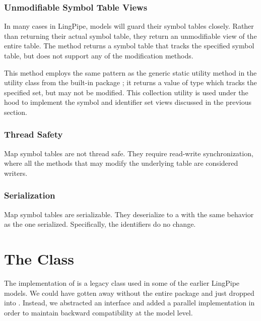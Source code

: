 \subsubsection{Unmodifiable Symbol Table Views}

In many cases in LingPipe, models will guard their symbol tables
closely.  Rather than returning their actual symbol table, they return
an unmodifiable view of the entire table.  The method
 returns a symbol table that tracks
the specified symbol table, but does not support any of the modification
methods.  

This method employs the same pattern as the generic static utility
method  in the utility
class  from the built-in package ;
it returns a value of type  which tracks the specified
set, but may not be modified.  This collection utility is used under
the hood to implement the symbol and identifier set views discussed in
the previous section.

\subsubsection{Thread Safety}

Map symbol tables are not thread safe.  They require read-write
synchronization, where all the methods that may modify the underlying
table are considered writers.

\subsubsection{Serialization}

Map symbol tables are serializable.  They deserialize to a
 with the same behavior as the one serialized.
Specifically, the identifiers do no change.



\section{The  Class}

The  implementation of  is
a legacy class used in some of the earlier LingPipe models.  We could
have gotten away without the entire  package
and just dropped  into .
Instead, we abstracted an interface and added a parallel
implementation in order to maintain backward compatibility at the
model level.


